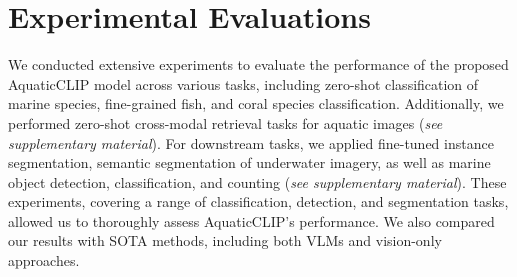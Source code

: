 \section{Experimental Evaluations}
\label{sec:results}
We conducted extensive experiments to evaluate the performance of the proposed AquaticCLIP model across various tasks, including zero-shot classification of marine species, fine-grained fish, and coral species classification. 
Additionally, we performed zero-shot cross-modal retrieval tasks for aquatic images (\textit{see supplementary material}). 
For downstream tasks, we applied fine-tuned instance segmentation, semantic segmentation of underwater imagery, as well as marine object detection, classification, and counting (\textit{see supplementary material}). 
These experiments, covering a range of classification, detection, and segmentation tasks, allowed us to thoroughly assess AquaticCLIP's performance. 
We also compared our results with SOTA methods, including both VLMs and vision-only approaches.

